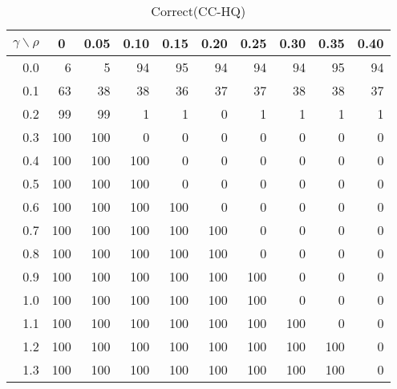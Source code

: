 \documentclass[12pt]{article}
\begin{document}
\begin{table}[!tbp]
\caption{Correct(CC-HQ)}
 \begin{center}
 \begin{tabular}{r|rrrrrrrrr}\hline\hline
\multicolumn{1}{c|}{$\gamma\backslash\rho$}&\multicolumn{1}{c}{0}&\multicolumn{1}{c}{0.05}&\multicolumn{1}{c}{0.10}&\multicolumn{1}{c}{0.15}&\multicolumn{1}{c}{0.20}&\multicolumn{1}{c}{0.25}&\multicolumn{1}{c}{0.30}&\multicolumn{1}{c}{0.35}&\multicolumn{1}{c}{0.40}\tabularnewline
\hline




0.0&  6&  5& 94& 95& 94& 94& 94& 95&94\tabularnewline
0.1& 63& 38& 38& 36& 37& 37& 38& 38&37\tabularnewline
0.2& 99& 99&  1&  1&  0&  1&  1&  1& 1\tabularnewline
0.3&100&100&  0&  0&  0&  0&  0&  0& 0\tabularnewline
0.4&100&100&100&  0&  0&  0&  0&  0& 0\tabularnewline
0.5&100&100&100&  0&  0&  0&  0&  0& 0\tabularnewline
0.6&100&100&100&100&  0&  0&  0&  0& 0\tabularnewline
0.7&100&100&100&100&100&  0&  0&  0& 0\tabularnewline
0.8&100&100&100&100&100&  0&  0&  0& 0\tabularnewline
0.9&100&100&100&100&100&100&  0&  0& 0\tabularnewline
1.0&100&100&100&100&100&100&  0&  0& 0\tabularnewline
1.1&100&100&100&100&100&100&100&  0& 0\tabularnewline
1.2&100&100&100&100&100&100&100&100& 0\tabularnewline
1.3&100&100&100&100&100&100&100&100& 0\tabularnewline
\hline
\end{tabular}

\end{center}

\end{table}

%
\end{document}
